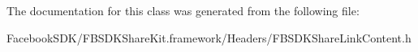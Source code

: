 The documentation for this class was generated from the following file\-:\begin{DoxyCompactItemize}
\item 
Facebook\-S\-D\-K/\-F\-B\-S\-D\-K\-Share\-Kit.\-framework/\-Headers/F\-B\-S\-D\-K\-Share\-Link\-Content.\-h\end{DoxyCompactItemize}

